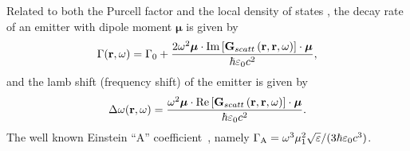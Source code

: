 Related to both the Purcell factor and the local density of states \cite{Yao2009b},
the decay rate of an emitter with dipole moment ${\bm \mu}$ is given by
\begin{equation}
 \Gamma (\mathbf{r},\omega) = \Gamma_0 + \frac{2 \omega^2 {\bm \mu}\cdot {\rm Im }\left[\mathbf{G}_{scatt} \left(\mathbf{r},\mathbf{r},\omega\right) \right]\cdot {\bm \mu}}{\hbar \varepsilon_0 c^2},
\end{equation}
and the lamb shift (frequency shift) of the emitter is given by
\begin{equation}
 \Delta \omega (\mathbf{r},\omega) = \frac{\omega^2 {\bm \mu}\cdot {\rm Re }\left[\mathbf{G}_{scatt} \left(\mathbf{r},\mathbf{r},\omega\right) \right]\cdot {\bm \mu}}{\hbar \varepsilon_0 c^2}.
\end{equation}
The well known Einstein ``A'' coefficient~\cite{Dung2000}, namely
$\Gamma_{\rm A}=\omega^3\mu_1^2\sqrt{\varepsilon}/(3\hbar\varepsilon_0c^3)$.

